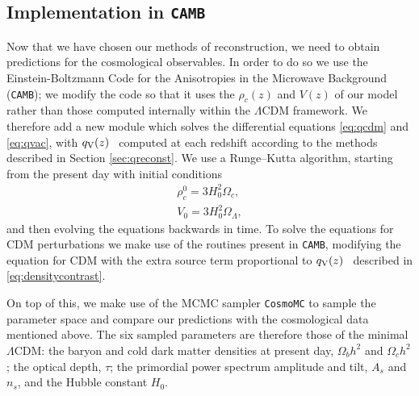 \documentclass[a4paper,fleqn,usenatbib]{mnras}
\newcommand*{\qv}{$q_{\rm V}(z)$}
\begin{document}
\subsection{Implementation in \texttt{CAMB}}\label{subsec:implementation}
Now that we have chosen our methods of reconstruction, we need to obtain predictions for the cosmological observables. In order to do so we use the Einstein-Boltzmann Code for the Anisotropies in the Microwave Background (\texttt{CAMB}); we modify the code so that it uses the $\rho_c(z)$ and $V(z)$ of our model rather than those computed internally within the $\Lambda$CDM framework. We therefore add a new module which solves the differential equations \eqref{eq:qcdm} and \eqref{eq:qvac}, with \qv~ computed at each redshift according to the methods described in Section \ref{sec:qreconst}. We use a Runge--Kutta algorithm, starting from the present day with initial conditions
\begin{eqnarray}\label{eq:inicon}
\rho_c^0=3H_0^2\Omega_c, \nonumber \\
V_0=3H_0^2\Omega_\Lambda,
\end{eqnarray}
and then evolving the equations backwards in time. To solve the equations for CDM perturbations we make use of the routines present in \texttt{CAMB}, modifying the equation for CDM with the extra source term proportional to \qv~ described in \eqref{eq:densitycontrast}.

On top of this, we make use of the MCMC sampler \texttt{CosmoMC} \citep{Lewis:2002ah, Lewis:2013hha} to sample the parameter space and compare our predictions with the cosmological data mentioned above. The six sampled parameters are therefore those of the minimal $\Lambda$CDM: the baryon and cold dark matter densities at present day, $\Omega_b h^2$ and $\Omega_ch^2$; the optical depth, $\tau$; the primordial power spectrum amplitude and tilt, $A_s$ and $n_s$, and the Hubble constant $H_0$.
\end{document}
